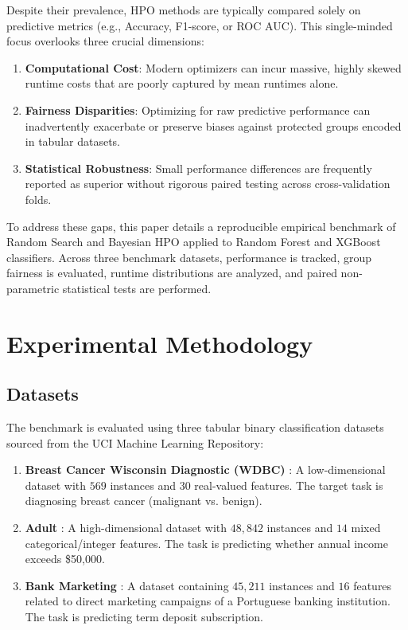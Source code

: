\documentclass[11pt,a4paper]{article}
\begin{document}
Despite their prevalence, HPO methods are typically compared solely on predictive metrics (e.g., Accuracy, F1-score, or ROC AUC). This single-minded focus overlooks three crucial dimensions:
\begin{enumerate}
    \item \textbf{Computational Cost}: Modern optimizers can incur massive, highly skewed runtime costs that are poorly captured by mean runtimes alone.
    \item \textbf{Fairness Disparities}: Optimizing for raw predictive performance can inadvertently exacerbate or preserve biases against protected groups encoded in tabular datasets.
    \item \textbf{Statistical Robustness}: Small performance differences are frequently reported as superior without rigorous paired testing across cross-validation folds.
\end{enumerate}

To address these gaps, this paper details a reproducible empirical benchmark of Random Search and Bayesian HPO applied to Random Forest and XGBoost classifiers. Across three benchmark datasets, performance is tracked, group fairness is evaluated, runtime distributions are analyzed, and paired non-parametric statistical tests are performed.

\section{Experimental Methodology}

\subsection{Datasets}
The benchmark is evaluated using three tabular binary classification datasets sourced from the UCI Machine Learning Repository:
\begin{enumerate}
    \item \textbf{Breast Cancer Wisconsin Diagnostic (WDBC)} \citep{wdbc}: A low-dimensional dataset with $569$ instances and $30$ real-valued features. The target task is diagnosing breast cancer (malignant vs. benign).
    \item \textbf{Adult} \citep{adult}: A high-dimensional dataset with $48,842$ instances and $14$ mixed categorical/integer features. The task is predicting whether annual income exceeds \$50,000.
    \item \textbf{Bank Marketing} \citep{bank_marketing}: A dataset containing $45,211$ instances and $16$ features related to direct marketing campaigns of a Portuguese banking institution. The task is predicting term deposit subscription.
\end{enumerate}
\end{document}
